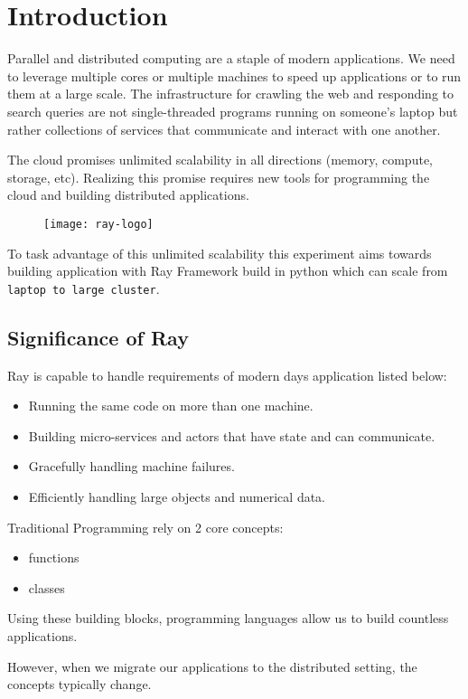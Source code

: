 \section{Introduction}
Parallel and distributed computing are a staple of modern applications. We need to leverage multiple cores or multiple machines to speed up applications or to run them at a large scale. The infrastructure for crawling the web and responding to search queries are not single-threaded programs running on someone’s laptop but rather collections of services that communicate and interact with one another.

The cloud promises unlimited scalability in all directions (memory, compute, storage, etc). Realizing this promise requires new tools for programming the cloud and building distributed applications.

\begin{figure}[!htbp]
    \centering
    \texttt{[image: ray-logo]}
\end{figure}

To task advantage of this unlimited scalability this experiment aims towards building application with Ray Framework build in python which can scale from \verb|laptop to large cluster|.


\subsection{Significance of Ray}
Ray is capable to handle requirements of modern days application listed below:
\begin{itemize}
    \item Running the same code on more than one machine.
    \item Building micro-services and actors that have state and can communicate.
    \item Gracefully handling machine failures.
    \item Efficiently handling large objects and numerical data.
\end{itemize}

Traditional Programming rely on 2 core concepts:
\begin{itemize}
    \item functions
    \item classes
\end{itemize}
Using these building blocks, programming languages allow us to build countless applications.

However, when we migrate our applications to the distributed setting, the concepts typically change.

